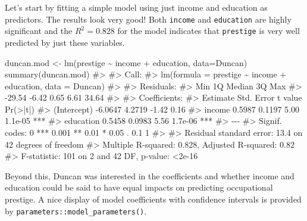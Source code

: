 \documentclass[
  letterpaper,
  10pt,
  krantz2]{krantz}
\makeatletter
\newenvironment{Shaded}{\begin{snugshade}}{\end{snugshade}}
\newcommand{\AttributeTok}[1]{\textcolor[rgb]{0.40,0.45,0.13}{#1}}
\newcommand{\CommentTok}[1]{\textcolor[rgb]{0.37,0.37,0.37}{#1}}
\newcommand{\FunctionTok}[1]{\textcolor[rgb]{0.28,0.35,0.67}{#1}}
\newcommand{\NormalTok}[1]{\textcolor[rgb]{0.00,0.23,0.31}{#1}}
\newcommand{\OtherTok}[1]{\textcolor[rgb]{0.00,0.23,0.31}{#1}}
\newcommand{\SpecialCharTok}[1]{\textcolor[rgb]{0.37,0.37,0.37}{#1}}
\newenvironment{kframe}{%
  \medskip{}
  \setlength{\fboxsep}{.8em}
  \def\at@end@of@kframe{}%
  \ifinner\ifhmode%
  \def\at@end@of@kframe{\end{minipage}}%
  \begin{minipage}{\columnwidth}%
  \fi\fi%
  \def\FrameCommand##1{\hskip\@totalleftmargin \hskip-\fboxsep
  \colorbox{shadecolor}{##1}\hskip-\fboxsep
      \hskip-\linewidth \hskip-\@totalleftmargin \hskip\columnwidth}%
  \MakeFramed {\advance\hsize-\width
    \@totalleftmargin\z@ \linewidth\hsize
    \@setminipage}}%
{\par\unskip\endMakeFramed%
  \at@end@of@kframe}
\renewenvironment{Shaded}{\begin{kframe}}{\end{kframe}}
\makeatother
\begin{document}
Let's start by fitting a simple model using just income and education as
predictors. The results look very good! Both \texttt{income} and
\texttt{education} are highly significant and the \(R^2 = 0.828\) for
the model indicates that \texttt{prestige} is very well predicted by
just these variables.

\begin{Shaded}
\begin{Highlighting}[]
\NormalTok{duncan.mod }\OtherTok{\textless{}{-}} \FunctionTok{lm}\NormalTok{(prestige }\SpecialCharTok{\textasciitilde{}}\NormalTok{ income }\SpecialCharTok{+}\NormalTok{ education, }\AttributeTok{data=}\NormalTok{Duncan)}
\FunctionTok{summary}\NormalTok{(duncan.mod)}
\CommentTok{\#\textgreater{} }
\CommentTok{\#\textgreater{} Call:}
\CommentTok{\#\textgreater{} lm(formula = prestige \textasciitilde{} income + education, data = Duncan)}
\CommentTok{\#\textgreater{} }
\CommentTok{\#\textgreater{} Residuals:}
\CommentTok{\#\textgreater{}    Min     1Q Median     3Q    Max }
\CommentTok{\#\textgreater{} {-}29.54  {-}6.42   0.65   6.61  34.64 }
\CommentTok{\#\textgreater{} }
\CommentTok{\#\textgreater{} Coefficients:}
\CommentTok{\#\textgreater{}             Estimate Std. Error t value Pr(\textgreater{}|t|)    }
\CommentTok{\#\textgreater{} (Intercept)  {-}6.0647     4.2719   {-}1.42     0.16    }
\CommentTok{\#\textgreater{} income        0.5987     0.1197    5.00  1.1e{-}05 ***}
\CommentTok{\#\textgreater{} education     0.5458     0.0983    5.56  1.7e{-}06 ***}
\CommentTok{\#\textgreater{} {-}{-}{-}}
\CommentTok{\#\textgreater{} Signif. codes:  0 \textquotesingle{}***\textquotesingle{} 0.001 \textquotesingle{}**\textquotesingle{} 0.01 \textquotesingle{}*\textquotesingle{} 0.05 \textquotesingle{}.\textquotesingle{} 0.1 \textquotesingle{} \textquotesingle{} 1}
\CommentTok{\#\textgreater{} }
\CommentTok{\#\textgreater{} Residual standard error: 13.4 on 42 degrees of freedom}
\CommentTok{\#\textgreater{} Multiple R{-}squared:  0.828,  Adjusted R{-}squared:  0.82 }
\CommentTok{\#\textgreater{} F{-}statistic:  101 on 2 and 42 DF,  p{-}value: \textless{}2e{-}16}
\end{Highlighting}
\end{Shaded}

Beyond this, Duncan was interested in the coefficients and whether
income and education could be said to have equal impacts on predicting
occupational prestige. A nice display of model coefficients with
confidence intervals is provided by
\texttt{parameters::model\_parameters()}.
\end{document}
